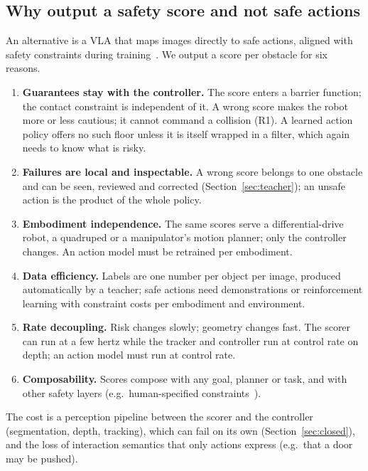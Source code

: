 \documentclass[10pt,a4paper]{article}
\begin{document}
\subsection{Why output a safety score and not safe actions}\label{sec:why}
An alternative is a VLA that maps images directly to safe actions, aligned with safety constraints during
training~\cite{zhang2025safevla}. We output a score per obstacle for six reasons.
\begin{enumerate}
\item \textbf{Guarantees stay with the controller.} The score enters a barrier function; the contact constraint is independent of it.
A wrong score makes the robot more or less cautious; it cannot command a collision (R1). A learned action policy offers no such
floor unless it is itself wrapped in a filter, which again needs to know what is risky.
\item \textbf{Failures are local and inspectable.} A wrong score belongs to one obstacle and can be seen, reviewed and corrected
(Section~\ref{sec:teacher}); an unsafe action is the product of the whole policy.
\item \textbf{Embodiment independence.} The same scores serve a differential-drive robot, a quadruped or a manipulator's motion
planner; only the controller changes. An action model must be retrained per embodiment.
\item \textbf{Data efficiency.} Labels are one number per object per image, produced automatically by a teacher; safe actions need
demonstrations or reinforcement learning with constraint costs per embodiment and environment.
\item \textbf{Rate decoupling.} Risk changes slowly; geometry changes fast. The scorer can run at a few hertz while the tracker
and controller run at control rate on depth; an action model must run at control rate.
\item \textbf{Composability.} Scores compose with any goal, planner or task, and with other safety layers (e.g.\ human-specified
constraints~\cite{feng2025words,santos2025updating}).
\end{enumerate}
The cost is a perception pipeline between the scorer and the controller (segmentation, depth, tracking), which can fail on its own
(Section~\ref{sec:closed}), and the loss of interaction semantics that only actions express (e.g.\ that a door may be pushed).
\end{document}
